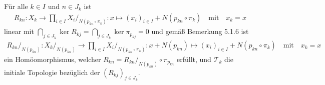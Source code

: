 \begin{solution}

Für alle $k \in I$ und $n \in J_k$ ist
\begin{align*}
    R_{kn}: X_k \to \prod_{i \in I} X_i /_{N(p_{kn} \circ \pi_k)}: x \mapsto (x_i)_{i \in I} + N(p_{kn} \circ \pi_k) \quad \textrm{mit} \quad x_k = x
\end{align*}
linear mit $\bigcap_{j \in J_k} \ker R_{kj} = \bigcap_{j \in J_k} \ker \pi_{p_{kj}} = 0$ und gemäß Bemerkung 5.1.6 ist
\begin{align*}
    R_{kn}/_{N(p_{kn})}: X_k/_{N(p_{kn})} \to \prod_{i \in I} X_i /_{N(p_{kn} \circ \pi_k)}: x + N(p_{kn}) \mapsto (x_i)_{i \in I} + N(p_{kn} \circ \pi_k) \quad \textrm{mit} \quad x_k = x
\end{align*}
ein Homöomorphismus, welcher $R_{kn} = R_{kn}/_{N(p_{kn})} \circ \pi_{p_{kn}}$ erfüllt, und $\mathcal{T}_k$ die initiale Topologie bezüglich der $(R_{kj})_{j \in J_k}$.

\end{solution}

